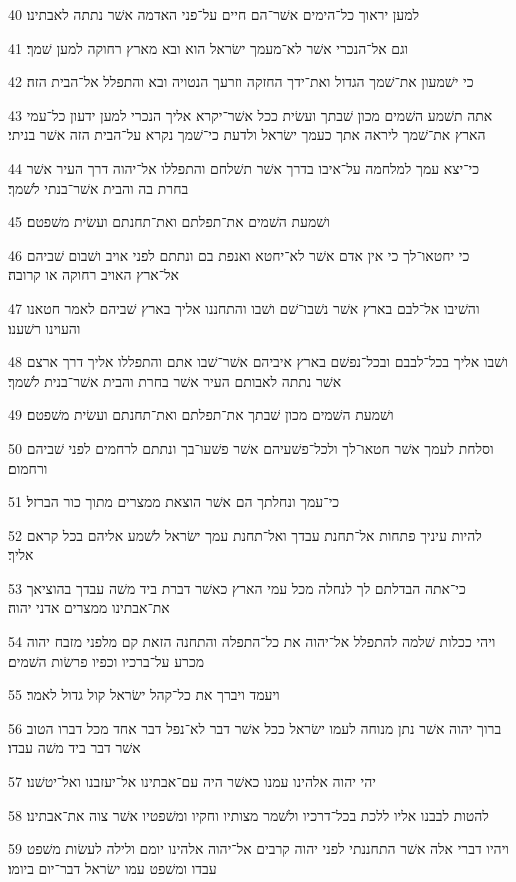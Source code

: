 \par 40 למען יראוך כל־הימים אשׁר־הם חיים על־פני האדמה אשׁר נתתה לאבתינו׃
\par 41 וגם אל־הנכרי אשׁר לא־מעמך ישׂראל הוא ובא מארץ רחוקה למען שׁמך׃
\par 42 כי ישׁמעון את־שׁמך הגדול ואת־ידך החזקה וזרעך הנטויה ובא והתפלל אל־הבית הזה׃
\par 43 אתה תשׁמע השׁמים מכון שׁבתך ועשׂית ככל אשׁר־יקרא אליך הנכרי למען ידעון כל־עמי הארץ את־שׁמך ליראה אתך כעמך ישׂראל ולדעת כי־שׁמך נקרא על־הבית הזה אשׁר בניתי׃
\par 44 כי־יצא עמך למלחמה על־איבו בדרך אשׁר תשׁלחם והתפללו אל־יהוה דרך העיר אשׁר בחרת בה והבית אשׁר־בנתי לשׁמך׃
\par 45 ושׁמעת השׁמים את־תפלתם ואת־תחנתם ועשׂית משׁפטם׃
\par 46 כי יחטאו־לך כי אין אדם אשׁר לא־יחטא ואנפת בם ונתתם לפני אויב ושׁבום שׁביהם אל־ארץ האויב רחוקה או קרובה׃
\par 47 והשׁיבו אל־לבם בארץ אשׁר נשׁבו־שׁם ושׁבו והתחננו אליך בארץ שׁביהם לאמר חטאנו והעוינו רשׁענו׃
\par 48 ושׁבו אליך בכל־לבבם ובכל־נפשׁם בארץ איביהם אשׁר־שׁבו אתם והתפללו אליך דרך ארצם אשׁר נתתה לאבותם העיר אשׁר בחרת והבית אשׁר־בנית לשׁמך׃
\par 49 ושׁמעת השׁמים מכון שׁבתך את־תפלתם ואת־תחנתם ועשׂית משׁפטם׃
\par 50 וסלחת לעמך אשׁר חטאו־לך ולכל־פשׁעיהם אשׁר פשׁעו־בך ונתתם לרחמים לפני שׁביהם ורחמום׃
\par 51 כי־עמך ונחלתך הם אשׁר הוצאת ממצרים מתוך כור הברזל׃
\par 52 להיות עיניך פתחות אל־תחנת עבדך ואל־תחנת עמך ישׂראל לשׁמע אליהם בכל קראם אליך׃
\par 53 כי־אתה הבדלתם לך לנחלה מכל עמי הארץ כאשׁר דברת ביד משׁה עבדך בהוציאך את־אבתינו ממצרים אדני יהוה׃
\par 54 ויהי ככלות שׁלמה להתפלל אל־יהוה את כל־התפלה והתחנה הזאת קם מלפני מזבח יהוה מכרע על־ברכיו וכפיו פרשׂות השׁמים׃
\par 55 ויעמד ויברך את כל־קהל ישׂראל קול גדול לאמר׃
\par 56 ברוך יהוה אשׁר נתן מנוחה לעמו ישׂראל ככל אשׁר דבר לא־נפל דבר אחד מכל דברו הטוב אשׁר דבר ביד משׁה עבדו׃
\par 57 יהי יהוה אלהינו עמנו כאשׁר היה עם־אבתינו אל־יעזבנו ואל־יטשׁנו׃
\par 58 להטות לבבנו אליו ללכת בכל־דרכיו ולשׁמר מצותיו וחקיו ומשׁפטיו אשׁר צוה את־אבתינו׃
\par 59 ויהיו דברי אלה אשׁר התחננתי לפני יהוה קרבים אל־יהוה אלהינו יומם ולילה לעשׂות משׁפט עבדו ומשׁפט עמו ישׂראל דבר־יום ביומו׃
